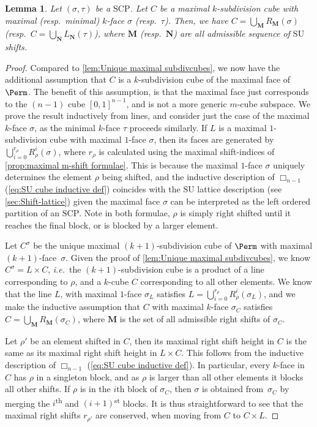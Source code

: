 \documentclass{amsart}
\newtheorem{lemma}[theorem]{Lemma}
\theoremstyle{definition}
\newcommand{\ie}{\textit{i.e.}~} %
\newcommand{\resp}{resp.~} %
\newcommand{\ordinal}{\textsuperscript{th}} %
\newcommand{\ordinalst}{\textsuperscript{st}} %
\newcommand{\SU}{\mathrm{SU}}
\newcommand{\SCP}{\mathrm{SCP}}
\newcommand{\divcube}[1]{\Box_{#1}}
\begin{document}
\begin{lemma}
Let $(\sigma,\tau)$ be a $\SCP$. 
Let $C$ be a maximal $k$-subdivision cube with maximal (\resp minimal) $k$-face $\sigma$ (\resp $\tau$).
Then, we have $C = \bigcup_{\mathbf{M}} R_\mathbf{M}(\sigma)$ (\resp ${C=\bigcup_{\mathbf{N}} L_\mathbf{N}(\tau)}$), where $\mathbf{M}$ (\resp $\mathbf{N}$) are all admissible sequence of $\SU$ shifts.
\end{lemma}

\begin{proof}
Compared to \cref{lem:Unique maximal subdivcubes}, we now have the additional assumption that $C$ is a $k$-subdivision cube of the maximal face of $\Perm$.
The benefit of this assumption, is that the maximal face just corresponds to the $(n-1)$ cube $[0,1]^{n-1}$, and is not a more generic $m$-cube subspace. 
We prove the result inductively from lines, and consider just the case of the maximal $k$-face $\sigma$, as the minimal $k$-face $\tau$ proceeds similarly.
If $L$ is a maximal $1$-subdivision cube with maximal $1$-face $\sigma$, then its faces are generated by $\bigcup_{i=0}^{r_\rho} R_\rho^i(\sigma)$, where $r_\rho$ is calculated using the maximal shift-indices of \cref{prop:maximal m-shift formulae}.
This is because the maximal $1$-face $\sigma$ uniquely determines the element $\rho$ being shifted, and the inductive description of $\divcube{n-1}$ (\cref{eq:SU cube inductive def}) coincides with the $\SU$ lattice description (see \cref{sec:Shift-lattice}) given the maximal face $\sigma$ can be interpreted as the left ordered partition of an $\SCP$.
Note in both formulae, $\rho$ is simply right shifted until it reaches the final block, or is blocked by a larger element.

Let $C^\sigma$ be the unique maximal $(k+1)$-subdivision cube of $\Perm$ with maximal $(k+1)$-face~$\sigma$.
Given the proof of \cref{lem:Unique maximal subdivcubes}, we know $C^\sigma = L\times C$, \ie the $(k+1)$-subdivision cube is a product of a line corresponding to $\rho$, and a $k$-cube $C$ corresponding to all other elements.
We know that the line $L$, with maximal $1$-face $\sigma_L$ satisfies $L=\bigcup_{i=0}^{r_\rho} R_\rho^i(\sigma_L)$, and we make the inductive assumption that $C$ with maximal $k$-face $\sigma_C$ satisfies $C = \bigcup_{\mathbf{M}}R_\mathbf{M}(\sigma_C)$, where $\mathbf{M}$ is the set of all admissible right shifts of $\sigma_C$.

Let $\rho'$ be an element shifted in $C$, then its maximal right shift height in $C$ is the same as its maximal right shift height in $L\times C$.
This follows from the inductive description of $\divcube{n-1}$ (\cref{eq:SU cube inductive def}).
In particular, every $k$-face in $C$ has $\rho$ in a singleton block, and as $\rho$ is larger than all other elements it blocks all other shifts.
If $\rho$ is in the $i$th block of $\sigma_C$, then $\sigma$ is obtained from~$\sigma_C$ by merging the $i$\ordinal{} and $(i+1)$\ordinalst{} blocks.
It is thus straightforward to see that the maximal right shifts $r_{\rho'}$ are conserved, when moving from $C$ to $C\times L$.


\end{proof}
\end{document}
